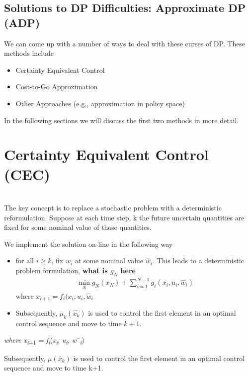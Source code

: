 \documentclass[twoside]{article}
\begin{document}
\subsection{Solutions to DP Difficulties: Approximate DP (ADP)}
We can come up with a number of ways to deal with these curses of DP. These methods include
\begin{itemize}
    \item Certainty Equivalent Control 
    \item Cost-to-Go Approximation
    \item Other Approaches (e.g., approximation in policy space)
\end{itemize}
In the following sections we will discuss the first two methods in more detail.
\section{Certainty Equivalent Control (CEC)}\\
	The key concept is to replace a stochastic problem with a deterministic reformulation. Suppose at each time step, k the future uncertain quantities are fixed for some nominal value of those quantities.
	
	We implement the solution on-line in the following way
	
	\begin{itemize}
	    \item for all $i \geq k$, fix $w_i$ at some nominal value $\hat{w}_i$. This leads to a deterministic problem formulation, 
	    \textbf{what is $g_N$ here}
	    \begin{eqnarray*}
	    \min_N g_N(x_N) + \sum_{i = 1}^{N - 1} g_i (x_i, u_i, \hat{w}_i)
	    \end{eqnarray*}
	    where $x_{i + 1} = f_i(x_i, u_i, \hat{w}_i$
	    \item Subsequently, $\mu_k(\hat{x_k})$ is used to control the first element in an optimal control sequence and move to time $k + 1$.
	\end{itemize}


	


{\fontsize{10pt}{12.0pt}\selectfont \textit{where x\textsubscript{i}}\textsubscript{+1} = \textit{f\textsubscript{i}}(\textit{x\textsubscript{i}}, \textit{u\textsubscript{i}}, \textit{w}¯\textit{\textsubscript{i}})}

Subsequently, $ \mu(\bar{x}_k)$ is used to control the first element in an optimal control sequence and move to time k+1.
\end{document}
